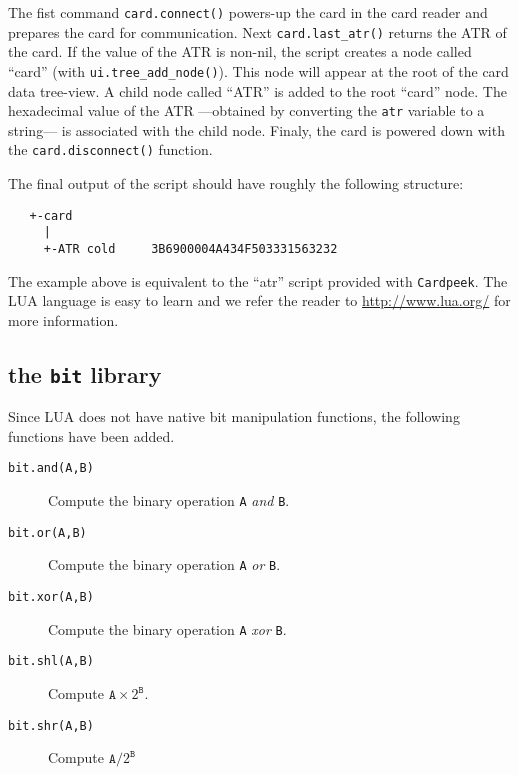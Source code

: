 \documentclass[11pt]{article}
\begin{document}
The fist command \texttt{card.connect()} powers-up the card in the card reader and prepares the card for communication. 
Next \texttt{card.last\_atr()} returns the ATR of the card. 
If the value of the ATR is non-nil, the script creates a node called ``card'' (with \texttt{ui.tree\_add\_node()}). 
This node will appear at the root of the card data tree-view.
A child node called ``ATR'' is added to the root ``card'' node. 
The hexadecimal value of the ATR ---obtained by converting the \texttt{atr} variable to a string---  is associated with the child node.
Finaly, the card is powered down with the \texttt{card.disconnect()} function.

The final output of the script should have roughly the following structure:
\begin{verbatim}
   +-card
     |
     +-ATR cold     3B6900004A434F503331563232
\end{verbatim}

The example above is equivalent to the ``atr'' script provided with \texttt{Cardpeek}.
The LUA language is easy to learn and we refer the reader to \url{http://www.lua.org/} for more information.

\subsection{the \texttt{bit} library}

Since LUA does not have native bit manipulation functions, the following functions have been added.

\begin{description}

\item[\texttt{bit.and(A,B)}]
{Compute the binary operation \texttt{A} \textit{and} \texttt{B}.}

\item[\texttt{bit.or(A,B)}]
{Compute the binary operation \texttt{A} \textit{or} \texttt{B}.}

\item[\texttt{bit.xor(A,B)}]
{Compute the binary operation \texttt{A} \textit{xor} \texttt{B}.}

\item[\texttt{bit.shl(A,B)}]
{Compute $\texttt{A}{\times}2^{\texttt{B}}$.}

\item[\texttt{bit.shr(A,B)}]
{Compute $\texttt{A}/2^{\texttt{B}}$}

\end{description}
\end{document}
